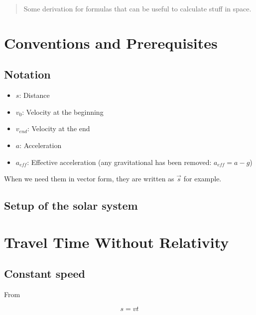 \documentclass[10pt]{article}
\numberwithin{equation}{section}
\begin{document}
	\maketitle
	\newpage
	
	\tableofcontents
	\newpage
	
	\begin{abstract}
		Some derivation for formulas that can be useful to calculate stuff in space.
	\end{abstract}
	
	\section{Conventions and Prerequisites}
	
	\subsection{Notation}
	
	\begin{itemize}
		\item $s$: Distance
		\item $v_0$: Velocity at the beginning
		\item $v_{end}$: Velocity at the end
		\item $a$: Acceleration
		\item $a_{eff}$: Effective acceleration (any gravitational has been removed: $a_{eff} = a - g$)
	\end{itemize}
	
	When we need them in vector form, they are written as $\vec{s}$ for example.
	
	\subsection{Setup of the solar system}
	
	\section{Travel Time Without Relativity}\label{TravelTime}
	
	\subsection{Constant speed}
	
	From 
	
	\begin{equation}
		s = vt
	\end{equation}
	
\end{document}
